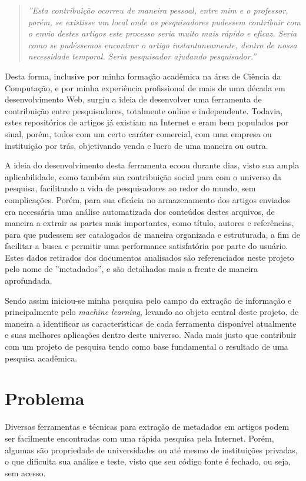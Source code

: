 \begin{quote}
\textit{''Esta contribuição ocorreu de maneira pessoal, entre mim e o professor, porém, se existisse um local onde os pesquisadores pudessem contribuir com o envio destes artigos este processo seria muito mais rápido e eficaz. Seria como se pudéssemos encontrar o artigo instantaneamente, dentro de nossa necessidade temporal. Seria pesquisador ajudando pesquisador.''}
\end{quote}

Desta forma, inclusive por minha formação acadêmica na área de Ciência da Computação, e por minha experiência profissional de mais de uma década em desenvolvimento Web, surgiu a ideia de desenvolver uma ferramenta de contribuição entre pesquisadores, totalmente online e independente. Todavia, estes repositórios de artigos já existiam na Internet e eram bem populados por sinal, porém, todos com um certo caráter comercial, com uma empresa ou instituição por trás, objetivando venda e lucro de uma maneira ou outra.

A ideia do desenvolvimento desta ferramenta ecoou durante dias, visto sua ampla aplicabilidade, como também sua contribuição social para com o universo da pesquisa, facilitando a vida de pesquisadores ao redor do mundo, sem complicações. Porém, para sua eficácia no armazenamento dos artigos enviados era necessária uma análise automatizada dos conteúdos destes arquivos, de maneira a extrair as partes mais importantes, como título, autores e referências, para que pudessem ser catalogados de maneira organizada e estruturada, a fim de facilitar a busca e permitir uma performance satisfatória por parte do usuário. Estes dados retirados dos documentos analisados são referenciados neste projeto pelo nome de ''metadados'', e são detalhados mais a frente de maneira aprofundada.

Sendo assim iniciou-se minha pesquisa pelo campo da extração de informação e principalmente pelo \textit{machine learning}, levando ao objeto central deste projeto, de maneira a identificar as características de cada ferramenta disponível atualmente e suas melhores aplicações dentro deste universo. Nada mais justo que contribuir com um projeto de pesquisa tendo como base fundamental o resultado de uma pesquisa acadêmica.

\section{Problema}

Diversas ferramentas e técnicas para extração de metadados em artigos podem ser facilmente encontradas com uma rápida pesquisa pela Internet. Porém, algumas são propriedade de universidades ou até mesmo de instituições privadas, o que dificulta sua análise e teste, visto que seu código fonte é fechado, ou seja, sem acesso.

